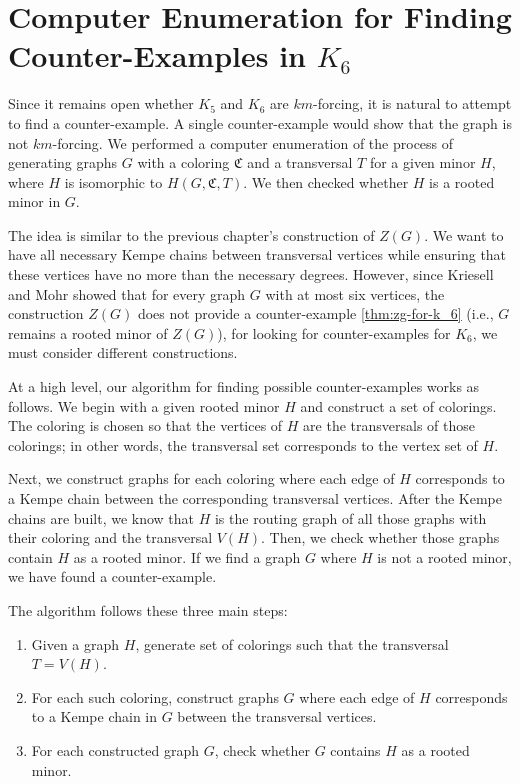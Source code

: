 \chapter{Computer Enumeration for Finding Counter-Examples in \( K_6 \)}

Since it remains open whether \( K_5 \) and \( K_6 \) are \( km \)-forcing, it is natural to attempt to find a counter-example.
A single counter-example would show that the graph is not \( km \)-forcing.
We performed a computer enumeration of the process of generating graphs \( G \) with a coloring \( \mathfrak{C} \) and a transversal \( T \) for a given minor \( H \),
where \( H \) is isomorphic to \( H(G, \mathfrak{C}, T) \). We then checked whether \( H \) is a rooted minor in \( G \).

The idea is similar to the previous chapter's construction of \( Z(G) \). 
We want to have all necessary Kempe chains between transversal vertices while ensuring that these vertices have no more than the necessary degrees.
However, since Kriesell and Mohr \cite{matthias_2022} showed that for every graph \( G \) with at most six vertices, the construction \( Z(G) \) does not
provide a counter-example \ref{thm:zg-for-k_6} (i.e., \( G \) remains a rooted minor of \( Z(G) \)), for looking for counter-examples 
for $K_6$, we must consider different constructions.

At a high level, our algorithm for finding possible counter-examples works as follows.
We begin with a given rooted minor \( H \) and construct a set of colorings.
The coloring is chosen so that the vertices of \( H \) are the transversals of those colorings; in other words, the transversal set corresponds to the vertex set of \( H \). 

Next, we construct graphs for each coloring where each edge of $H$ corresponds to a Kempe chain between the corresponding transversal vertices. After the Kempe chains are built, 
we know that \( H \) is the routing graph of all those graphs with their coloring and the transversal $V(H)$. 
Then, we check whether those graphs contain \( H \) as a rooted minor. 
If we find a graph \( G \) where \( H \) is not a rooted minor, we have found a counter-example.

The algorithm follows these three main steps:
\begin{enumerate}
    \item Given a graph \( H \), generate set of colorings such that the transversal \( T = V(H) \).
    \item For each such coloring, construct graphs $G$ where each edge of $H$ corresponds to a Kempe chain in $G$ between the transversal vertices.
    \item For each constructed graph \( G \), check whether \( G \) contains \( H \) as a rooted minor.
\end{enumerate}

